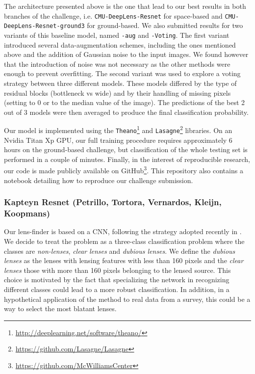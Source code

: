 \documentclass{aa}
\newcommand{\red}[1]{{\color{red} #1}}
\begin{document}
The architecture presented above is the one that lead to our best results in both branches of the challenge, i.e. \texttt{CMU-DeepLens-Resnet} for space-based and \texttt{CMU-DeepLens-Resnet-ground3} for ground-based. We also submitted results for two variants of this baseline model, named \texttt{-aug} and \texttt{-Voting}. 
The first variant introduced several data-augmentation schemes, including the ones mentioned above and the addition of Gaussian noise to the input images. We found however that the introduction of noise was not necessary as the other methods were enough to prevent overfitting. 
The second variant was used to explore a voting strategy between three different models. These models differed by the type of residual blocks (bottleneck vs wide) and by their handling of missing pixels (setting to 0 or to the median value of the image). The predictions of the best 2 out of 3 models were then averaged to produce the final classification probability.


Our model is implemented using the \texttt{Theano}\footnote{\url{http://deeplearning.net/software/theano/}} and \texttt{Lasagne}\footnote{\url{https://github.com/Lasagne/Lasagne}} libraries. On an Nvidia Titan Xp GPU, our full training procedure requires approximately 6 hours on the ground-based challenge, but classification of the whole testing set is performed in a couple of minutes. Finally, in the interest of reproducible research, our code is made publicly available on GitHub\footnote{\url{https://github.com/McWilliamsCenter} }.
This repository also contains a notebook detailing how to reproduce our challenge submission.

\subsubsection{Kapteyn Resnet (Petrillo, Tortora, Vernardos, Kleijn, Koopmans) }
\label{sec:KapteynResnet}

Our lens-finder is based on a CNN, following the strategy adopted recently in \citep{2017arXiv170207675P}. 
We decide to treat the problem as a three-class classification problem where the classes are \textit{non-lenses}, \textit{clear lenses} and \textit{dubious lenses}. We define the \textit{dubious lenses} as the lenses with lensing features with less than 160 pixels and the \textit{clear lenses} those with more than 160 pixels belonging to the lensed source. This choice is motivated by the fact that specializing the network in recognizing different classes could lead to a more robust classification. In addition, in a hypothetical application of the method to real data from a survey, this could be a way to select the most blatant lenses.  
\end{document}
